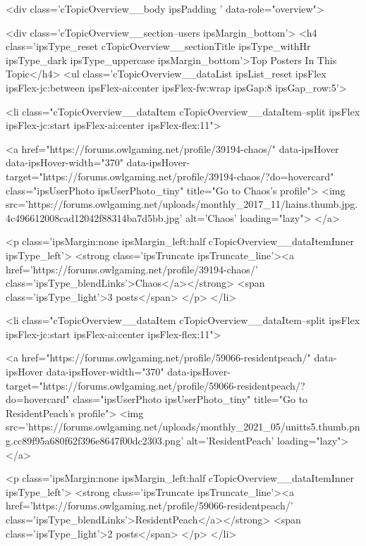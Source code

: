 	<div class='cTopicOverview__body ipsPadding ' data-role="overview">
		
			<div class='cTopicOverview__section--users ipsMargin_bottom'>
				<h4 class='ipsType_reset cTopicOverview__sectionTitle ipsType_withHr ipsType_dark ipsType_uppercase ipsMargin_bottom'>Top Posters In This Topic</h4>
				<ul class='cTopicOverview__dataList ipsList_reset ipsFlex ipsFlex-jc:between ipsFlex-ai:center ipsFlex-fw:wrap ipsGap:8 ipsGap_row:5'>
					
						<li class="cTopicOverview__dataItem cTopicOverview__dataItem--split ipsFlex ipsFlex-jc:start ipsFlex-ai:center ipsFlex-flex:11">
							


	<a href="https://forums.owlgaming.net/profile/39194-chaos/" data-ipsHover data-ipsHover-width="370" data-ipsHover-target="https://forums.owlgaming.net/profile/39194-chaos/?do=hovercard" class="ipsUserPhoto ipsUserPhoto_tiny" title="Go to Chaos's profile">
		<img src='https://forums.owlgaming.net/uploads/monthly_2017_11/hains.thumb.jpg.4c496612008cad12042f88314ba7d5bb.jpg' alt='Chaos' loading="lazy">
	</a>

							<p class='ipsMargin:none ipsMargin_left:half cTopicOverview__dataItemInner ipsType_left'>
								<strong class='ipsTruncate ipsTruncate_line'><a href='https://forums.owlgaming.net/profile/39194-chaos/' class='ipsType_blendLinks'>Chaos</a></strong>
								<span class='ipsType_light'>3 posts</span>
							</p>
						</li>
					
						<li class="cTopicOverview__dataItem cTopicOverview__dataItem--split ipsFlex ipsFlex-jc:start ipsFlex-ai:center ipsFlex-flex:11">
							


	<a href="https://forums.owlgaming.net/profile/59066-residentpeach/" data-ipsHover data-ipsHover-width="370" data-ipsHover-target="https://forums.owlgaming.net/profile/59066-residentpeach/?do=hovercard" class="ipsUserPhoto ipsUserPhoto_tiny" title="Go to ResidentPeach's profile">
		<img src='https://forums.owlgaming.net/uploads/monthly_2021_05/unitts5.thumb.png.cc89f95a680f62f396e8647f00dc2303.png' alt='ResidentPeach' loading="lazy">
	</a>

							<p class='ipsMargin:none ipsMargin_left:half cTopicOverview__dataItemInner ipsType_left'>
								<strong class='ipsTruncate ipsTruncate_line'><a href='https://forums.owlgaming.net/profile/59066-residentpeach/' class='ipsType_blendLinks'>ResidentPeach</a></strong>
								<span class='ipsType_light'>2 posts</span>
							</p>
						</li>
					
